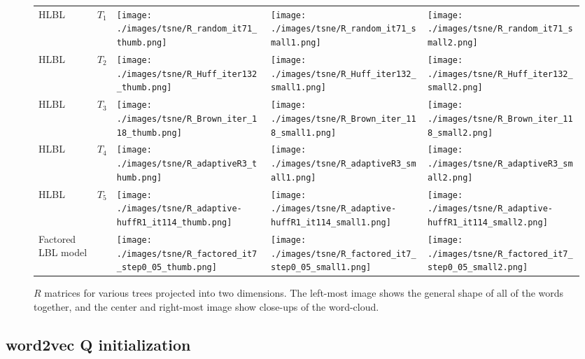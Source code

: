 \begin{figure}[p]
\centering
\begin{tabular}{@{}m{1cm}m{1cm}m{3.5cm}m{3.5cm}m{3.5cm}@{}}

HLBL & $T_1$ &
\texttt{[image: ./images/tsne/R\_random\_it71\_thumb.png]} &
\texttt{[image: ./images/tsne/R\_random\_it71\_small1.png]} &
\texttt{[image: ./images/tsne/R\_random\_it71\_small2.png]}
\\
HLBL & $T_2$ &
\texttt{[image: ./images/tsne/R\_Huff\_iter132\_thumb.png]} &
\texttt{[image: ./images/tsne/R\_Huff\_iter132\_small1.png]} &
\texttt{[image: ./images/tsne/R\_Huff\_iter132\_small2.png]}
\\
HLBL & $T_3$ &
\texttt{[image: ./images/tsne/R\_Brown\_iter\_118\_thumb.png]} &
\texttt{[image: ./images/tsne/R\_Brown\_iter\_118\_small1.png]} &
\texttt{[image: ./images/tsne/R\_Brown\_iter\_118\_small2.png]}
\\
HLBL & $T_4$ &
\texttt{[image: ./images/tsne/R\_adaptiveR3\_thumb.png]} &
\texttt{[image: ./images/tsne/R\_adaptiveR3\_small1.png]} &
\texttt{[image: ./images/tsne/R\_adaptiveR3\_small2.png]}
\\
HLBL &$T_5$ &
\texttt{[image: ./images/tsne/R\_adaptive-huffR1\_it114\_thumb.png]} &
\texttt{[image: ./images/tsne/R\_adaptive-huffR1\_it114\_small1.png]} &
\texttt{[image: ./images/tsne/R\_adaptive-huffR1\_it114\_small2.png]}
\\
Factored LBL model &  &
\texttt{[image: ./images/tsne/R\_factored\_it7\_step0\_05\_thumb.png]} &
\texttt{[image: ./images/tsne/R\_factored\_it7\_step0\_05\_small1.png]} &
\texttt{[image: ./images/tsne/R\_factored\_it7\_step0\_05\_small2.png]}
\end{tabular}
\caption{$R$ matrices for various trees projected into two dimensions. The left-most image shows the general shape of all of the words together, and the center and right-most image show close-ups of the word-cloud.}
\label{fig:Rcloud}
\end{figure}

\subsection{word2vec Q initialization} \label{sec:ADAPTIVEQ}
